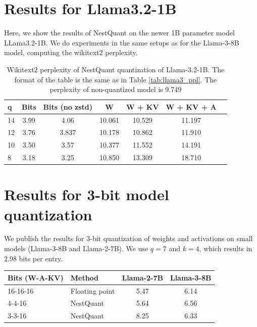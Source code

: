 \documentclass{article}
\newif\ifisicml
\theoremstyle{plain}
\theoremstyle{definition}
\theoremstyle{remark}
\begin{document}
\section{Results for Llama3.2-1B}

Here, we show the results of NestQuant on the newer 1B parameter model LLama3.2-1B. We do experiments in the same setups as for the Llama-3-8B model, computing the wikitext2 perplexity.

\begin{table}[h!]
\centering
\scriptsize
\begin{tabular}{lcccccc}
    \toprule
\textbf{q}& \textbf{Bits} & \textbf{Bits (no zstd)} &  \textbf{W}&
\textbf{W + KV}&
\textbf{W + KV + A}\\    \midrule
    14 & 3.99& 4.06& 10.061& 10.529& 11.197\\
    12 & 3.76& 3.837& 10.178& 10.862& 11.910\\
    10 & 3.50& 3.57& 10.377& 11.552& 14.191\\
    8 & 3.18& 3.25& 10.850& 13.309& 18.710\\
    \bottomrule
\end{tabular}
\ifisicml\else\vspace{1em}\fi
\caption{Wikitext2 perplexity of NestQuant quantization of Llama-3.2-1B. The format of the table is the same as in Table \ref{tab:llama3_ppl}. The perplexity of non-quantized model is 9.749} 
\label{tab:llama1b_ppl}
\end{table}

\section{Results for 3-bit model quantization}

We publish the results for 3-bit quantization of weights and activations on small models (Llama-3-8B and Llama-2-7B). We use $q = 7$ and $k = 4$, which results in 2.98 bits per entry.

\begin{table}[h!]
\centering
\scriptsize
\begin{tabular}{llcc}
    \toprule
    \textbf{Bits (W-A-KV)}& \textbf{Method}& \textbf{Llama-2-7B}& \textbf{Llama-3-8B} \\
    \midrule
    16-16-16 & Floating point &5.47 & 6.14 \\
    4-4-16 & NestQuant      & 5.64& 6.56 \\
    3-3-16  & NestQuant   & 8.25 & 6.33 \\
    \bottomrule
\end{tabular}
\end{table}
\end{document}
